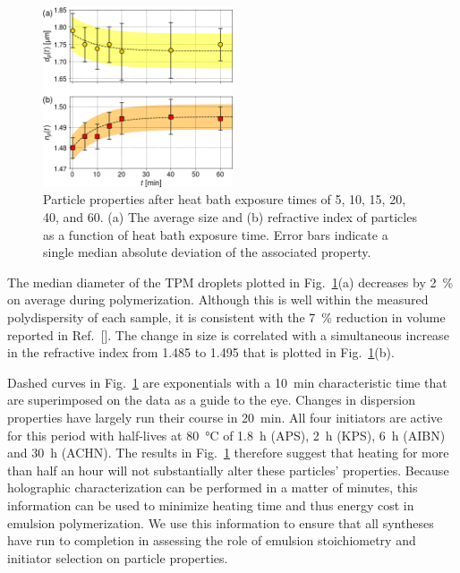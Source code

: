 \documentclass[journal=langd5,manuscript=article]{achemso}
\begin{document}
\begin{figure}
  \centering
  \includegraphics[width=0.5\textwidth]{polymerization04}
  \caption{Particle properties after heat bath exposure times
    of \num{5}, \num{10}, \num{15}, \num{20}, \num{40}, and 
    \SI{60}{\min}.
    (a) The average size and (b) refractive index of particles as a function
    of heat bath exposure time.
    Error bars indicate a single median absolute deviation
    of the associated property.}
  \label{fig:heat_size_time}
\end{figure}

The median diameter of the TPM droplets plotted
in Fig.~\ref{fig:heat_size_time}(a)
decreases by \SI{2}{\percent} on average
during polymerization.
Although this is well within the
measured polydispersity of each sample, 
it is consistent with the \SI{7}{\percent} reduction
in volume reported in Ref.~[{\hspace*{-1ex}}].
The change in size is correlated with 
a simultaneous increase in the refractive index
from \num{1.485} to \num{1.495} that is
plotted in Fig.~\ref{fig:heat_size_time}(b).

Dashed curves in Fig.~\ref{fig:heat_size_time}
are exponentials with a \SI{10}{\minute} characteristic
time that are superimposed on the data as a guide
to the eye.
Changes in dispersion properties have largely run
their course in \SI{20}{\minute}.
All four initiators are active for this period with
half-lives at \SI{80}{\degreeCelsius} of \SI{1.8}{\hour}
(APS\cite{borisov2015kinetic}),
\SI{2}{\hour} (KPS\cite{beylerian2002kinetics}), 
\SI{6}{\hour} (AIBN) and \SI{30}{\hour}
(ACHN).
The results in Fig.~\ref{fig:heat_size_time} therefore
suggest that heating for more than half an hour
will not substantially alter these particles'
properties.
Because holographic characterization can be performed
in a matter of minutes, this
information can be used to minimize heating time
and thus energy cost in emulsion polymerization.
We use this information to ensure that all syntheses
have run to completion in assessing the
role of emulsion stoichiometry and initiator
selection on particle properties.
\end{document}
